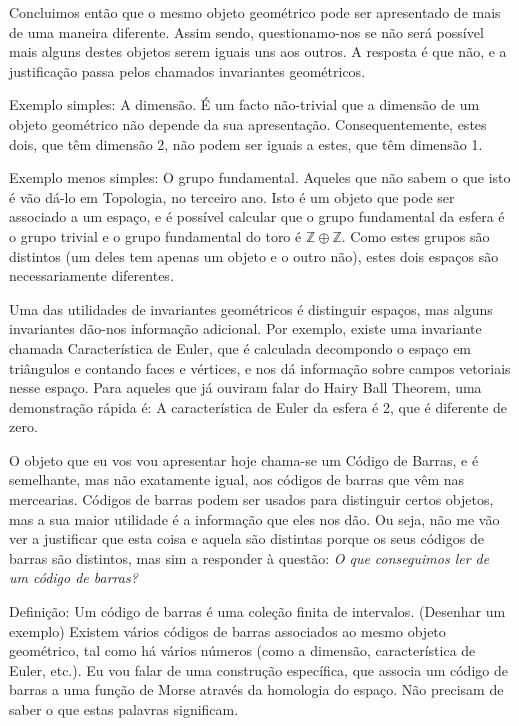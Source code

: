 \documentclass{article}
\theoremstyle{nonumberplain}
\newcommand{\Z}{\mathbb{Z}}
\begin{document}
Concluimos então que o mesmo objeto geométrico pode ser apresentado de mais de uma maneira diferente. Assim sendo, questionamo-nos se não será possível mais alguns destes objetos serem iguais uns aos outros. A resposta é que não, e a justificação passa pelos chamados invariantes geométricos.

Exemplo simples: A dimensão. É um facto não-trivial que a dimensão de um objeto geométrico não depende da sua apresentação. Consequentemente, estes dois, que têm dimensão 2, não podem ser iguais a estes, que têm dimensão 1.

Exemplo menos simples: O grupo fundamental. Aqueles que não sabem o que isto é vão dá-lo em Topologia, no terceiro ano. Isto é um objeto que pode ser associado a um espaço, e é possível calcular que o grupo fundamental da esfera é o grupo trivial e o grupo fundamental do toro é $\Z \oplus \Z$. Como estes grupos são distintos (um deles tem apenas um objeto e o outro não), estes dois espaços são necessariamente diferentes.

Uma das utilidades de invariantes geométricos é distinguir espaços, mas alguns invariantes dão-nos informação adicional. Por exemplo, existe uma invariante chamada Característica de Euler, que é calculada decompondo o espaço em triângulos e contando faces e vértices, e nos dá informação sobre campos vetoriais nesse espaço. Para aqueles que já ouviram falar do Hairy Ball Theorem, uma demonstração rápida é: A característica de Euler da esfera é 2, que é diferente de zero.

O objeto que eu vos vou apresentar hoje chama-se um Código de Barras, e é semelhante, mas não exatamente igual, aos códigos de barras que vêm nas mercearias. Códigos de barras podem ser usados para distinguir certos objetos, mas a sua maior utilidade é a informação que eles nos dão. Ou seja, não me vão ver a justificar que esta coisa e aquela são distintas porque os seus códigos de barras são distintos, mas sim a responder à questão: \emph{O que conseguimos ler de um código de barras?}

Definição: Um código de barras é uma coleção finita de intervalos. (Desenhar um exemplo) Existem vários códigos de barras associados ao mesmo objeto geométrico, tal como há vários números (como a dimensão, característica de Euler, etc.). Eu vou falar de uma construção específica, que associa um código de barras a uma função de Morse através da homologia do espaço. Não precisam de saber o que estas palavras significam.

\end{document}
